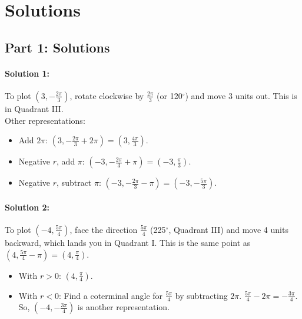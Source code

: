 \documentclass{article}
\begin{document}
\newpage
\section{Solutions}

\subsection*{Part 1: Solutions}
\paragraph{Solution 1:} To plot $(3, -\frac{2\pi}{3})$, rotate clockwise by $\frac{2\pi}{3}$ (or 120$^\circ$) and move 3 units out. This is in Quadrant III. \\
Other representations:
\begin{itemize}
    \item Add $2\pi$: $(3, -\frac{2\pi}{3} + 2\pi) = (3, \frac{4\pi}{3})$.
    \item Negative $r$, add $\pi$: $(-3, -\frac{2\pi}{3} + \pi) = (-3, \frac{\pi}{3})$.
    \item Negative $r$, subtract $\pi$: $(-3, -\frac{2\pi}{3} - \pi) = (-3, -\frac{5\pi}{3})$.
\end{itemize}

\paragraph{Solution 2:} To plot $(-4, \frac{5\pi}{4})$, face the direction $\frac{5\pi}{4}$ (225$^\circ$, Quadrant III) and move 4 units backward, which lands you in Quadrant I. This is the same point as $(4, \frac{5\pi}{4} - \pi) = (4, \frac{\pi}{4})$.
\begin{itemize}
    \item With $r > 0$: $(4, \frac{\pi}{4})$.
    \item With $r < 0$: Find a coterminal angle for $\frac{5\pi}{4}$ by subtracting $2\pi$. $\frac{5\pi}{4} - 2\pi = -\frac{3\pi}{4}$. So, $(-4, -\frac{3\pi}{4})$ is another representation.
\end{itemize}
\end{document}
